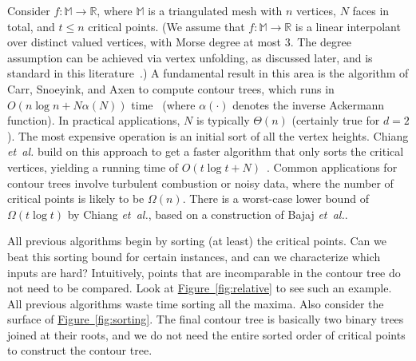\documentclass[11pt]{article}
\theoremstyle{definition}
\newcommand{\MM}{\mathbb{M}}
\newcommand{\RR}{\mathbb{R}}
\newcommand{\Fig}[1]{\hyperref[fig:#1]{Figure~\ref*{fig:#1}}} %
\newcommand{\Reminder}[1]{{\color{red}#1}}
\newcommand{\Sesh}[1]{\Reminder{Sesh interjects: #1}}
\newcommand{\etal}{\textit{et~al.}\xspace}
\newcommand{\XSays}[2]{{
      {$\rule[-0.12cm]{0.2in}{0.5cm}$\fbox{\tt
            #1:} }
      \textcolor{red}{#2}
      \marginpar{\textcolor{blue}{#1}}
      {$\rule[0.1cm]{0.3in}{0.1cm}$\fbox{\tt
            end}$\rule[0.1cm]{0.3in}{0.1cm}$}
      }
   }
\renewcommand{\XSays}[2]{}%
\newcommand{\Ben}[1]{{\XSays{Ben}{#1}}}
\begin{document}
Consider $f: \MM \to \RR$, where $\MM$ is a triangulated mesh with $n$ vertices, $N$ faces in total, and $t \leq n$ critical points. 
(We assume that $f:\MM \to \RR$ is a linear interpolant over distinct valued vertices, with Morse degree at most $3$. 
The degree assumption can be achieved via vertex unfolding, as discussed later,
and is standard in this literature~\cite{kobps-ctsssit-97}.)
A fundamental result in this area is the algorithm of Carr, Snoeyink, and Axen to compute contour trees,
which runs in $O(n\log n + N\alpha(N))$ time~\cite{csa-cctad-03} (where $\alpha(\cdot)$ denotes the inverse
Ackermann function). In practical applications, $N$ is typically $\Theta(n)$
(certainly true for $d=2$). The most expensive operation is an initial sort of all the vertex
heights. Chiang \etal build on this approach to get a faster algorithm that only sorts the critical vertices,
yielding a running time of $O(t\log t + N)$~\cite{cllr-sooscctmp-05}.
Common applications for contour trees involve turbulent combustion or noisy data, where the number of critical points is likely to be $\Omega(n)$.
There is a worst-case
lower bound of $\Omega(t\log t)$ by Chiang \etal \cite{cllr-sooscctmp-05}, based on a construction of Bajaj \etal \cite{BaKr+98}.

All previous algorithms begin by sorting (at least) the critical points. Can we beat this sorting bound for certain instances,
and can we characterize which inputs are hard? Intuitively, points that are incomparable in the contour tree
do not need to be compared. Look at \Fig{relative} to see such an example. All previous algorithms waste time
sorting all the maxima. Also consider the surface of \Fig{sorting}. The final contour tree is basically two binary
trees joined at their roots, and we do not need the entire sorted order of critical points
to construct the contour tree. 

\end{document}
